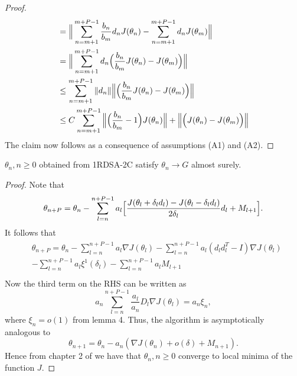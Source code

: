 \begin{proof}
\begin{align*}
  & =\Big{\|}\sum_{n=m+1}^{m+P-1}\frac{b_n}{b_m}d_n J(\theta_n)-\sum_{n=m+1}^{m+P-1}d_n J(\theta_{m})\Big{\|}\\
  & =\Big{\|}\sum_{n=m+1}^{m+P-1}d_n\Big{(}\frac{b_n}{b_m}J(\theta_n)-J(\theta_{m})\Big{)}\Big{\|}\\
  & \leq \sum_{n=m+1}^{m+P-1}\|d_n\|\Big{\|}\Big{(}\frac{b_n}{b_m}J(\theta_n)-J(\theta_{m})\Big{)}\Big{\|}\\
  &\leq C \sum_{n=m+1}^{m+P-1}\Big{\|}\Big{(}\frac{b_n}{b_m}-1\Big{)} J(\theta_n)\Big{\|}
  +\Big{\|}\Big{(} J(\theta_n)- J(\theta_{m})\Big{)}\Big{\|}
\end{align*}
The claim now follows as a consequence of assumptions (A1) and (A2).
\end{proof}
\begin{theorem}
 $\theta_n, n\geq0$ obtained from 1RDSA-2C satisfy $\theta_n \rightarrow G$
 almost surely.
\end{theorem}
\begin{proof}
 Note that
 \begin{equation*}
  \theta_{n+P} = \theta_n-\sum\limits_{l=n}^{n+P-1}a_l\Big{[}\frac{J(\theta_l+\delta_l d_l)-J(\theta_l-\delta_l d_l)}{2\delta_l}d_l+M_{l+1}\Big{]}.
 \end{equation*}
It follows that
 \begin{align*}
  \begin{split}
  & \theta_{n+P} = \theta_n-\sum_{l=n}^{n+P-1}a_l\nabla J(\theta_l) 
   -\sum_{l=n}^{n+P-1}a_l(d_ld_l^T-I)\nabla J(\theta_l)\\
  & -\sum_{l=n}^{n+P-1}a_l \xi^{1}(\delta_l)-\sum_{l=n}^{n+P-1}a_lM_{l+1}\\
  \end{split}
 \end{align*}
Now the third term on the RHS can be written as
$$a_n\sum_{l=n}^{n+P-1}\frac{a_l}{a_n}D_{l}\nabla J(\theta_l)=a_n\xi_{n},$$
where $\xi_{n}=o(1)$ from lemma 4.
Thus, the algorithm is asymptotically analogous to
$$\theta_{n+1}=\theta_n-a_n(\nabla J(\theta_n)+o(\delta)+M_{n+1}).$$
Hence from chapter 2 of \cite{borkar2008stochastic} we have that $\theta_n, n\geq0$ converge to
local minima of the function $J.$
\end{proof}
